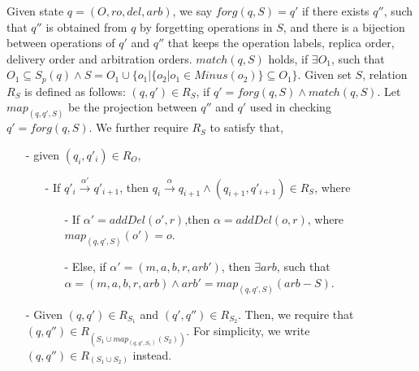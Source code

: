 Given state $q=(O,\mathit{ro},\mathit{del},\mathit{arb})$, we say $forg(q,S) = q'$ if there exists $q''$, such that $q''$ is obtained from $q$ by forgetting operations in $S$, and there is a bijection between operations of $q'$ and $q''$ that keeps the operation labels, replica order, delivery order and arbitration orders. $match(q,S)$ holds, if $\exists O_1$, such that $O_1 \subseteq S_p(q) \wedge S = O_1 \cup \{ o_1 \vert  \{ o_2 \vert o_1 \in Minus(o_2) \} \subseteq O_1 \}$. Given set $S$, relation $R_{S}$ is defined as follows: $(q,q') \in R_{S}$, if $q' = forg(q,S) \wedge match(q,S)$. Let $map_{(q,q',S)}$ be the projection between $q''$ and $q'$ used in checking $q' = forg(q,S)$. We further require $R_{S}$ to satisfy that,

\begin{itemize}
\setlength{\itemsep}{0.5pt}
\item[-] given $(q_i,q'_i) \in R_{O}$,

    \begin{itemize}
    \setlength{\itemsep}{0.5pt}
    \item[-] If $q'_i {\xrightarrow{\alpha'}} q'_{i+1}$, then $q_i {\xrightarrow{\alpha}} q_{i+1} \wedge (q_{i+1},q'_{i+1}) \in R_{S}$, where

        \begin{itemize}
        \setlength{\itemsep}{0.5pt}
        \item[-] If $\alpha' = addDel(o',r)$,then $\alpha = addDel(o,r)$, where $map_{(q,q',S)}(o')=o$.

        \item[-] Else, if $\alpha'=(m,a,b,r,\mathit{arb}')$, then $\exists \mathit{arb}$, such that $\alpha=(m,a,b,r,\mathit{arb}) \wedge \mathit{arb}' = map_{(q,q',S)}(\mathit{arb} - S)$.
        \end{itemize}
    \end{itemize}

\item[-] Given $(q,q') \in R_{ S_1 }$ and $(q',q'') \in R_{ S_2 }$. Then, we require that $(q,q'') \in R_{ ( S_1 \cup map_{(q,q',S_1)}(S_2) ) }$. For simplicity, we write $(q,q'') \in R_{ ( S_1 \cup S_2 ) }$ instead.
\end{itemize}



